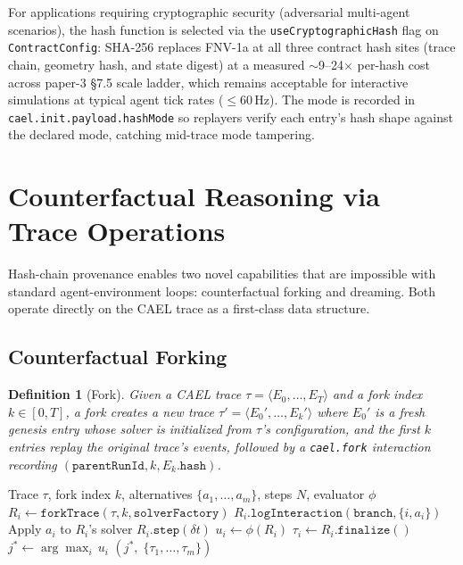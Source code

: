 \documentclass[sigconf,nonacm]{acmart}
\newtheorem{definition}{Definition}
\newcommand{\caelstate}[1]{E_{#1}}
\begin{document}
For applications requiring cryptographic security (adversarial
multi-agent scenarios), the hash function is selected via the
\texttt{useCryptographicHash} flag on \texttt{ContractConfig}: SHA-256
replaces FNV-1a at all three contract hash sites (trace chain, geometry
hash, and state digest) at a measured $\sim$9--24$\times$ per-hash cost
across paper-3 §7.5 scale ladder, which remains acceptable for
interactive simulations at typical agent tick rates ($\leq$60\,Hz). The
mode is recorded in \texttt{cael.init.payload.hashMode} so replayers
verify each entry's hash shape against the declared mode, catching
mid-trace mode tampering.

\section{Counterfactual Reasoning via Trace Operations}
\label{sec:counterfactual}

Hash-chain provenance enables two novel capabilities that are impossible
with standard agent-environment loops: counterfactual forking and
dreaming. Both operate directly on the CAEL trace as a first-class
data structure.

\subsection{Counterfactual Forking}

\begin{definition}[Fork]
\label{def:fork}
Given a CAEL trace $\tau = \langle \caelstate{0}, \ldots, \caelstate{T}
\rangle$ and a fork index $k \in [0, T]$, a fork creates a new
trace $\tau' = \langle \caelstate{0}', \ldots, \caelstate{k}' \rangle$
where $\caelstate{0}'$ is a fresh genesis entry whose solver is
initialized from $\tau$'s configuration, and the first $k$ entries
replay the original trace's events, followed by a
\texttt{cael.fork} interaction recording
$(\texttt{parentRunId}, k, \caelstate{k}.\texttt{hash})$.
\end{definition}

\begin{algorithm}[t]
\caption{Fork-Compare-Choose}
\label{alg:fork}
\begin{algorithmic}[1]
\Require Trace $\tau$, fork index $k$, alternatives
  $\{a_1, \ldots, a_m\}$, steps $N$, evaluator $\phi$
  \State $R_i \leftarrow \texttt{forkTrace}(\tau, k, \texttt{solverFactory})$
  \State $R_i.\texttt{logInteraction}(\texttt{branch}, \{i, a_i\})$
  \State Apply $a_i$ to $R_i$'s solver
    \State $R_i.\texttt{step}(\delta t)$
  \EndFor
  \State $u_i \leftarrow \phi(R_i)$
  \State $\tau_i \leftarrow R_i.\texttt{finalize}()$
\EndFor
\State $j^* \leftarrow \arg\max_i\, u_i$
\State \Return $(j^*,\; \{\tau_1, \ldots, \tau_m\})$
\end{algorithmic}
\end{algorithm}
\end{document}
